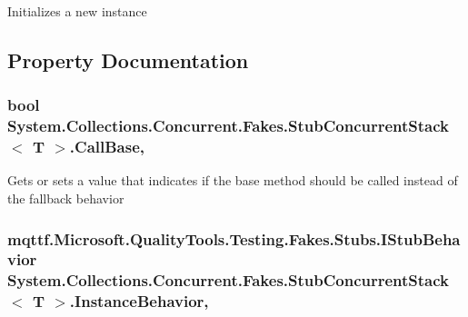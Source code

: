 Initializes a new instance



\subsection{Property Documentation}
\hypertarget{class_system_1_1_collections_1_1_concurrent_1_1_fakes_1_1_stub_concurrent_stack_3_01_t_01_4_a89db4971588f936522cb343145a10c2a}{
\subsubsection[{Call\-Base}]{\setlength{\rightskip}{0pt plus 5cm}bool System.\-Collections.\-Concurrent.\-Fakes.\-Stub\-Concurrent\-Stack$<$ T $>$.Call\-Base\hspace{0.3cm}{\ttfamily [get]}, {\ttfamily [set]}}}\label{class_system_1_1_collections_1_1_concurrent_1_1_fakes_1_1_stub_concurrent_stack_3_01_t_01_4_a89db4971588f936522cb343145a10c2a}


Gets or sets a value that indicates if the base method should be called instead of the fallback behavior

\hypertarget{class_system_1_1_collections_1_1_concurrent_1_1_fakes_1_1_stub_concurrent_stack_3_01_t_01_4_a0a1de162e182ba8f3188bd122c797f81}{
\subsubsection[{Instance\-Behavior}]{\setlength{\rightskip}{0pt plus 5cm}mqttf.\-Microsoft.\-Quality\-Tools.\-Testing.\-Fakes.\-Stubs.\-I\-Stub\-Behavior System.\-Collections.\-Concurrent.\-Fakes.\-Stub\-Concurrent\-Stack$<$ T $>$.Instance\-Behavior\hspace{0.3cm}{\ttfamily [get]}, {\ttfamily [set]}}}\label{class_system_1_1_collections_1_1_concurrent_1_1_fakes_1_1_stub_concurrent_stack_3_01_t_01_4_a0a1de162e182ba8f3188bd122c797f81}


